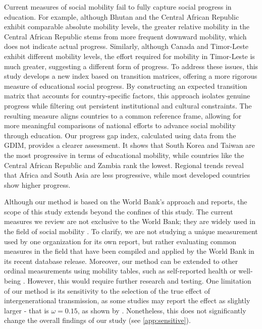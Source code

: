 Current measures of social mobility fail to fully capture social progress in education. For example, although Bhutan and the Central African Republic exhibit comparable absolute mobility levels, the greater relative mobility in the Central African Republic stems from more frequent downward mobility, which does not indicate actual progress. Similarly, although Canada and Timor-Leste exhibit different mobility levels, the effort required for mobility in Timor-Leste is much greater, suggesting a different form of progress. To address these issues, this study develops a new index based on transition matrices, offering a more rigorous measure of educational social progress. By constructing an expected transition matrix that accounts for country-specific factors, this approach isolates genuine progress while filtering out persistent institutional and cultural constraints. The resulting measure aligns countries to a common reference frame, allowing for more meaningful comparisons of national efforts to advance social mobility through education. Our progress gap index, calculated using data from the GDIM, provides a clearer assessment. It shows that South Korea and Taiwan are the most progressive in terms of educational mobility, while countries like the Central African Republic and Zambia rank the lowest. Regional trends reveal that Africa and South Asia are less progressive, while most developed countries show higher progress.

Although our method is based on the World Bank’s approach and reports, the scope of this study extends beyond the confines of this study. The current measures we review are not exclusive to the World Bank; they are widely used in the field of social mobility \citep{corak2020canadian, chetty2014land, asher2019getting, alesina2021intergenerational, chetty2017fading}. To clarify, we are not studying a unique measurement used by one organization for its own report, but rather evaluating common measures in the field that have been compiled and applied by the World Bank in its recent database release. Moreover, our method can be extended to other ordinal measurements using mobility tables, such as self-reported health \citep{halliday2021intergenerational} or well-being \citep{molina2011intergenerational}. However, this would require further research and testing. One limitation of our method is its sensitivity to the selection of the true effect of intergenerational transmission, as some studies may report the effect as slightly larger - that is $\omega=0.15$, as shown by \citet{fleury2018intergenerational}. Nonetheless, this does not significantly change the overall findings of our study (see \ref{app:sensitive}).

